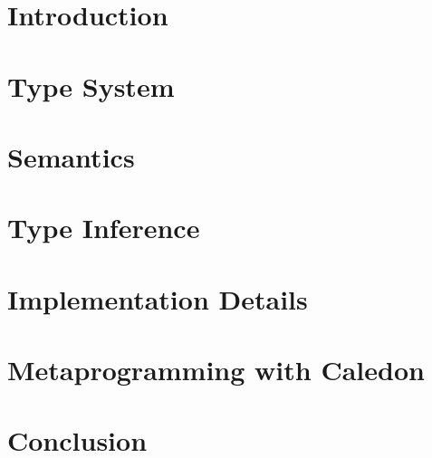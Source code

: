 \documentclass[12pt]{cmuthesis}
\begin{document}
\chapter{Introduction}
    
    

\chapter{Type System}
    
     
    
    

\chapter{Semantics}
    
    
    
    
    
    
    
    
   
\chapter{Type Inference}
    
     
    

\chapter{Implementation Details}
    
    
    
     
    
    

\chapter{Metaprogramming with Caledon}
       
    
    
    

\chapter{Conclusion}
   
   
   
\appendix

\end{document}
